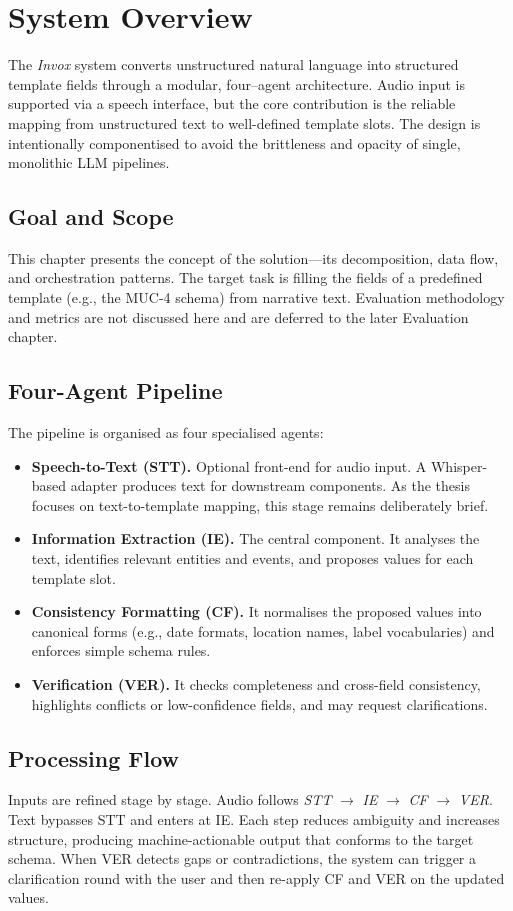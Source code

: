 \section{System Overview}
\label{sec:concept-overview}

The \textit{Invox} system converts unstructured natural language into structured template fields through a modular, four–agent architecture. Audio input is supported via a speech interface, but the core contribution is the reliable mapping from unstructured text to well-defined template slots. The design is intentionally componentised to avoid the brittleness and opacity of single, monolithic LLM pipelines.

\subsection{Goal and Scope}
This chapter presents the concept of the solution---its decomposition, data flow, and orchestration patterns. The target task is filling the fields of a predefined template (e.g., the MUC-4 schema) from narrative text. Evaluation methodology and metrics are not discussed here and are deferred to the later Evaluation chapter.

\subsection{Four-Agent Pipeline}
The pipeline is organised as four specialised agents:
\begin{itemize}
    \item \textbf{Speech-to-Text (STT).} Optional front-end for audio input. A Whisper-based adapter produces text for downstream components. As the thesis focuses on text-to-template mapping, this stage remains deliberately brief.
    \item \textbf{Information Extraction (IE).} The central component. It analyses the text, identifies relevant entities and events, and proposes values for each template slot.
    \item \textbf{Consistency Formatting (CF).} It normalises the proposed values into canonical forms (e.g., date formats, location names, label vocabularies) and enforces simple schema rules.
    \item \textbf{Verification (VER).} It checks completeness and cross-field consistency, highlights conflicts or low-confidence fields, and may request clarifications.
\end{itemize}

\subsection{Processing Flow}
Inputs are refined stage by stage. Audio follows \textit{STT} $\rightarrow$ \textit{IE} $\rightarrow$ \textit{CF} $\rightarrow$ \textit{VER}. Text bypasses STT and enters at IE. Each step reduces ambiguity and increases structure, producing machine-actionable output that conforms to the target schema. When VER detects gaps or contradictions, the system can trigger a clarification round with the user and then re-apply CF and VER on the updated values.

